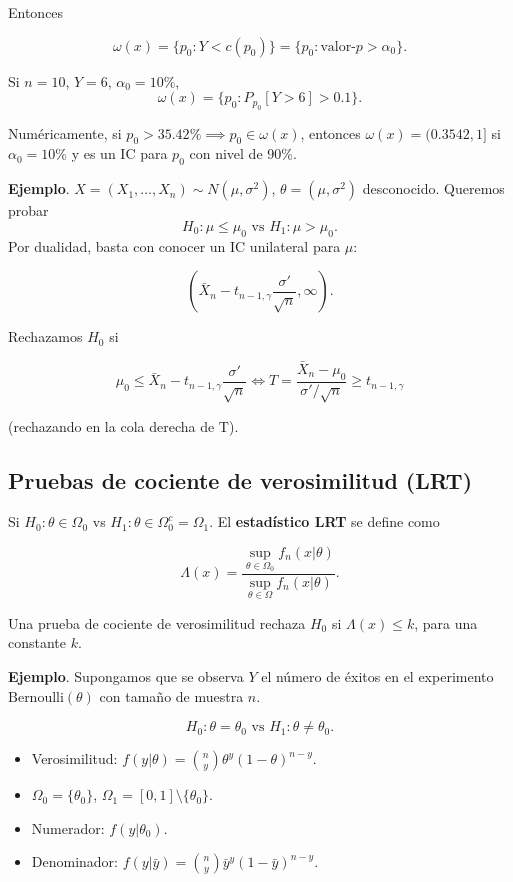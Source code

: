 \documentclass[
  12pt,
]{book}
\begin{document}
Entonces

\[\omega(x) = \{p_0: Y<c(p_0)\} = \{p_0: \text{valor-}p>\alpha_0\}.\]

Si \(n=10\), \(Y=6\), \(\alpha_0 = 10\%\),
\[\omega(x) =\{p_0: P_{p_0}[Y> 6] >0.1\}.\]

Numéricamente, si \(p_0 > 35.42\% \implies p_0 \in \omega(x)\), entonces \(\omega(x) = (0.3542,1]\) si \(\alpha_0=10\%\) y es un IC para \(p_0\) con nivel de 90\%.

\textbf{Ejemplo}. \(X = (X_1,\dots, X_n)\sim N(\mu,\sigma^2)\), \(\theta = (\mu,\sigma^2)\) desconocido. Queremos probar
\[ H_0: \mu \leq \mu_0 \text{ vs } H_1: \mu > \mu_0.\]
Por dualidad, basta con conocer un IC unilateral para \(\mu\):

\[ \left(\bar X_n-t_{n-1,\gamma}\dfrac{\sigma'}{\sqrt n},\infty\right).\]

Rechazamos \(H_0\) si

\[\mu_0\leq \bar X_n-t_{n-1,\gamma}\dfrac{\sigma'}{\sqrt n} \Leftrightarrow T = \dfrac{\bar X_n -\mu_0}{\sigma'/\sqrt n}\geq t_{n-1,\gamma}\]

(rechazando en la cola derecha de T).

\hypertarget{pruebas-de-cociente-de-verosimilitud-lrt}{%
\subsection{Pruebas de cociente de verosimilitud (LRT)}\label{pruebas-de-cociente-de-verosimilitud-lrt}}

Si \(H_0:\theta \in \Omega_0\) vs \(H_1: \theta \in \Omega_0^c = \Omega_1\). El \textbf{estadístico LRT} se define como

\[\Lambda (x) = \dfrac{\sup_{\theta\in \Omega_0} f_n(x|\theta)}{\sup_{\theta\in \Omega} f_n(x|\theta)}.\]

Una prueba de cociente de verosimilitud rechaza \(H_0\) si \(\Lambda(x)\leq k\), para una constante \(k\).

\textbf{Ejemplo}. Supongamos que se observa \(Y\) el número de éxitos en el experimento \(\text{Bernoulli}(\theta)\) con tamaño de muestra \(n\).

\[H_0: \theta = \theta_0 \text{ vs } H_1: \theta\ne\theta_0.\]

\begin{itemize}
\item
  Verosimilitud: \(f(y|\theta) = {n\choose y}\theta ^y(1-\theta)^{n-y}\).
\item
  \(\Omega_0 = \{\theta_0\}\), \(\Omega_1 = [0,1]\setminus \{\theta_0\}\).
\item
  Numerador: \(f(y|\theta_0)\).
\item
  Denominador: \(f(y|\bar y) = \displaystyle{n\choose y}{\bar y}^{y}(1-\bar y)^{n-y}\).
\end{itemize}
\end{document}
